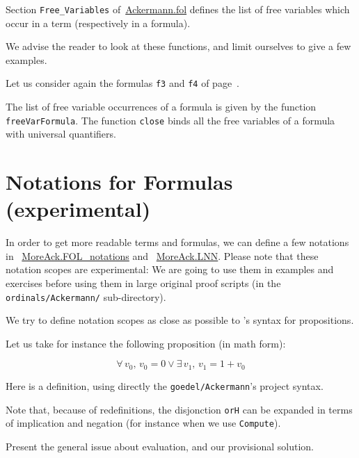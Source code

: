 Section \texttt{Free\_Variables} 
of~\href{../theories/html/hydras.Ackermann.fol.html}{Ackermann.fol} defines the list of free variables which occur in a term (respectively in a formula).

We advise the reader to look at these functions, and limit ourselves to give a few examples.

Let us consider again the formulas \texttt{f3} and \texttt{f4} of page~\pageref{fol:examplesf1f2f3}.

The list of free variable occurrences of a formula is given by the function \texttt{freeVarFormula}. The function \texttt{close}
binds all the free variables of a formula with universal quantifiers.









\section{Notations for Formulas (experimental)}

In order to get more readable terms and formulas, we can define a few notations in ~\href{../theories/html/hydras.MoreAck.FOL_notations.html}{MoreAck.FOL\_notations} and
~\href{../theories/html/hydras.MoreAck.LNN.html}{MoreAck.LNN}.
Please note that these notation scopes are experimental: We are going to use them in examples and exercises before using them in large original proof scripts (in the \texttt{ordinals/Ackermann/} sub-directory).

We try to define notation scopes as close as possible to \coq's syntax for propositions.

Let us take for instance the following proposition (in math form):

$$\forall\, v_0,\, v_0=0\vee \exists\,v_1,\,v_1=1+v_0$$

Here is a definition, using directly the \texttt{goedel/Ackermann}'s project syntax.


Note that, because of redefinitions, the disjonction \texttt{orH}
can be expanded in terms of  implication and negation (for instance when we use \texttt{Compute}).

\begin{todo}
  Present the general issue about evaluation, and our provisional solution.
\end{todo}

